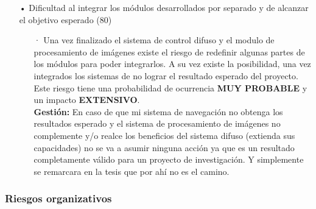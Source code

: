 \begin{itemize}
         \item[•] Dificultad al integrar los módulos desarrollados por separado y de alcanzar el objetivo esperado (80)
        \begin{itemize}
            \item[·] Una vez finalizado el sistema de control difuso y el modulo de procesamiento de imágenes existe el riesgo de redefinir algunas partes de los módulos para poder integrarlos. A su vez existe la posibilidad, una vez integrados los sistemas de no lograr el resultado esperado del proyecto. Este riesgo tiene una probabilidad de ocurrencia \textbf{MUY PROBABLE} y un impacto \textbf{EXTENSIVO}.\\
            \textbf{Gestión:} En caso de que mi sistema de navegación no obtenga los resultados esperado y el sistema de procesamiento de imágenes no complemente y/o realce los beneficios del sistema difuso (extienda sus capacidades) no se va a asumir ninguna acción ya que es un resultado completamente válido para un proyecto de investigación. Y simplemente se remarcara en la tesis que por ahí no es el camino.
        \end{itemize}
        
    \end{itemize}


\subsubsection{Riesgos organizativos}

